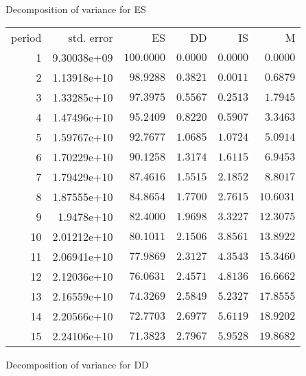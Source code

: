 \documentclass[11pt]{article}
\begin{document}
\thispagestyle{empty}

\vspace{1em}

Decomposition of variance for ES

\vspace{1em}

\begin{longtable}{rrrrrr}
period &  std. error &  ES &  DD &  IS &  M \\
1 & 9.30038e+09 & $100.0000$ & $0.0000$ & $0.0000$ & $0.0000$\\
2 & 1.13918e+10 & $98.9288$ & $0.3821$ & $0.0011$ & $0.6879$\\
3 & 1.33285e+10 & $97.3975$ & $0.5567$ & $0.2513$ & $1.7945$\\
4 & 1.47496e+10 & $95.2409$ & $0.8220$ & $0.5907$ & $3.3463$\\
5 & 1.59767e+10 & $92.7677$ & $1.0685$ & $1.0724$ & $5.0914$\\
6 & 1.70229e+10 & $90.1258$ & $1.3174$ & $1.6115$ & $6.9453$\\
7 & 1.79429e+10 & $87.4616$ & $1.5515$ & $2.1852$ & $8.8017$\\
8 & 1.87555e+10 & $84.8654$ & $1.7700$ & $2.7615$ & $10.6031$\\
9 & 1.9478e+10 & $82.4000$ & $1.9698$ & $3.3227$ & $12.3075$\\
10 & 2.01212e+10 & $80.1011$ & $2.1506$ & $3.8561$ & $13.8922$\\
11 & 2.06941e+10 & $77.9869$ & $2.3127$ & $4.3543$ & $15.3460$\\
12 & 2.12036e+10 & $76.0631$ & $2.4571$ & $4.8136$ & $16.6662$\\
13 & 2.16559e+10 & $74.3269$ & $2.5849$ & $5.2327$ & $17.8555$\\
14 & 2.20566e+10 & $72.7703$ & $2.6977$ & $5.6119$ & $18.9202$\\
15 & 2.24106e+10 & $71.3823$ & $2.7967$ & $5.9528$ & $19.8682$\\
\end{longtable}

\vspace{1em}

Decomposition of variance for DD

\vspace{1em}
\end{document}
